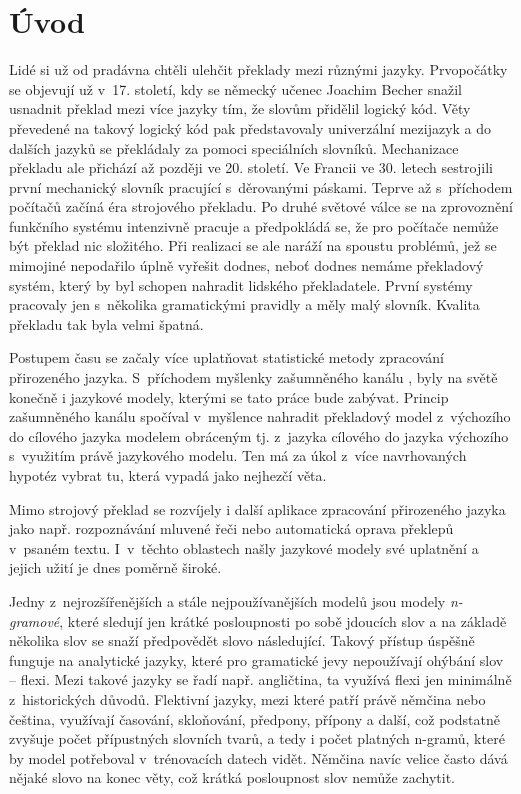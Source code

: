 \documentclass[12pt,a4paper]{report}
\def\chapwithtoc#1{
\chapter*{#1}
\addcontentsline{toc}{chapter}{#1}
}
\begin{document}
\pagestyle{plain}
\setlength\textheight{247mm}
\setlength\topmargin{0mm}
\chapwithtoc{Úvod}
Lidé si už od pradávna chtěli ulehčit překlady mezi různými jazyky. Prvopočátky se objevují už v~17. století, kdy se německý učenec Joachim Becher snažil usnadnit překlad mezi více jazyky tím, že slovům přidělil logický kód. Věty převedené na takový logický kód pak představovaly univerzální mezijazyk a do dalších jazyků se překládaly za pomoci speciálních slovníků. Mechanizace překladu ale přichází až později ve 20. století. Ve Francii ve 30. letech sestrojili první mechanický slovník pracující s~děrovanými páskami. Teprve až s~příchodem počítačů začíná éra strojového překladu. Po druhé světové válce se na zprovoznění funkčního systému intenzivně pracuje a předpokládá se, že pro počítače nemůže být překlad nic složitého. Při realizaci se ale naráží na spoustu problémů, jež se mimojiné nepodařilo úplně vyřešit dodnes, neboť dodnes nemáme překladový systém, který by byl schopen nahradit lidského překladatele. První systémy pracovaly jen s~několika gramatickými pravidly a měly malý slovník. Kvalita překladu tak byla velmi špatná.

Postupem času se začaly více uplatňovat statistické metody zpracování přirozeného jazyka. S~příchodem myšlenky zašumněného kanálu \cite{jurafsky08}, byly na světě konečně i jazykové modely, kterými se tato práce bude zabývat. Princip zašumněného kanálu spočíval v~myšlence nahradit překladový model z~výchozího do cílového jazyka modelem obráceným tj. z~jazyka cílového do jazyka výchozího s~využitím právě jazykového modelu. Ten má za úkol z~více navrhovaných hypotéz vybrat tu, která vypadá jako nejhezčí věta.

Mimo strojový překlad se rozvíjely i další aplikace zpracování přirozeného jazyka jako např. rozpoznávání mluvené řeči nebo automatická oprava překlepů v~psaném textu. I~v~těchto oblastech našly jazykové modely své uplatnění a jejich užití je dnes poměrně široké.

Jedny z~nejrozšířenějších a stále nejpoužívanějších modelů jsou modely \textit{n-gramové}, které sledují jen krátké posloupnosti po sobě jdoucích slov a na základě několika slov se snaží předpovědět slovo následující. Takový přístup úspěšně funguje na analytické jazyky, které pro gramatické jevy nepoužívají ohýbání slov -- flexi. Mezi takové jazyky se řadí např. angličtina, ta využívá flexi jen minimálně z~historických důvodů. Flektivní jazyky, mezi které patří právě němčina nebo čeština, využívají časování, skloňování, předpony, přípony a další, což podstatně zvyšuje počet přípustných slovních tvarů, a tedy i počet platných n-gramů, které by model potřeboval v~trénovacích datech vidět. Němčina navíc velice často dává nějaké slovo na konec věty, což krátká posloupnost slov nemůže zachytit.
\end{document}
